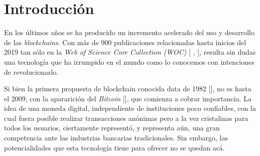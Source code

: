 \chapter*{Introducción}\label{chapter:introduction}

En los \'ultimos a\~nos se ha producido un incremento acelerado del uso y desarrollo de las \emph{blockchains}. Con m\'as de 900 publicaciones relacionadas hasta inicios del 2019 tan s\'olo en la \emph{Web of Science Core Collection (WOC)} [\cite{xu2019systematic} , \cite{yli2016current}], resulta sin dudas una tecnolog\'ia que ha irrumpido en el mundo como lo conocemos con intenciones de revolucionarlo. %

Si bien la primera propuesta de blockchain conocida data de 1982 [\cite{chaum1979computer}], no es hasta el 2009, con la apararici\'on del \emph{Bitcoin} [\cite{nakamoto2008bitcoin}], que comienza a cobrar importancia. La idea de una moneda digital, independiente de instituciones poco confiables, con la cual fuera posible realizar transacciones an\'onimas pero a la vez cristalinas para todos los usuarios, ciertamente represent\'o, y representa a\'un, una gran competencia ante las industrias bancarias tradicionales. Sin embargo, las potencialidades que esta tecnolog\'ia tiene para ofrecer no se quedan ac\'a. %




